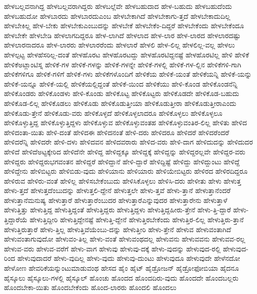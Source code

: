{ಹೇಳಬಲ್ಲವನಾಗಿದ್ದ
ಹೇಳಬಲ್ಲವರಾಗಿದ್ದರು
ಹೇಳಬಲ್ಲೆವೇ
ಹೇಳಬಹುದಾದ
ಹೇಳ-ಬಹುದು
ಹೇಳಬಹುದೆಂದು
ಹೇಳಬಹುದೋ
ಹೇಳಬಾರದು
ಹೇಳಬಾರದುಎಂಬ
ಹೇಳಬೇಕಾಗಿದೆ
ಹೇಳಬೇಕಾಗು-ತ್ತದೆ
ಹೇಳಬೇಕಾದುದಿಲ್ಲ
ಹೇಳಬೇಕಿಲ್ಲ
ಹೇಳ-ಬೇಕು
ಹೇಳಬೇಕುಎಂಬುದನ್ನು
ಹೇಳಬೇಕೆ
ಹೇಳಬೇಕೆಂ-ದಿದ್ದರೆ
ಹೇಳಬೇಕೆಂದು
ಹೇಳಬೇಕೆಂದೂ
ಹೇಳಬೇಕೇ
ಹೇಳಬೇಡಿ
ಹೇಳಲಾಗದಿದ್ದರೂ
ಹೇಳ-ಲಾಗಿದೆ
ಹೇಳಲಾದ
ಹೇಳ-ಲಾರ
ಹೇಳ-ಲಾರದ
ಹೇಳಲಾರದಷ್ಟು
ಹೇಳಲಾರನಾದರೂ
ಹೇಳ-ಲಾರರು
ಹೇಳಲಾರರೆಂದು
ಹೇಳಲಾರೆ
ಹೇಳಲಿ
ಹೇಳ-ಲಿಲ್ಲ
ಹೇಳಲಿಲ್ಲ-ವಲ್ಲ
ಹೇಳಲು
ಹೇಳಲ್ಪಟ್ಟ
ಹೇಳಹೆಸರಿಲ್ಲ-ದಂತೆ
ಹೇಳಹೊರಟ
ಹೇಳಹೊರಟದ್ದು
ಹೇಳಹೊರಟಿದ್ದನಷ್ಟೆ
ಹೇಳಹೊರಟಿಲ್ಲ
ಹೇಳಿ
ಹೇಳಿಕೆ
ಹೇಳಿಕೆಅಟ್ಲಾಂಟಿಸ್ನ
ಹೇಳಿಕೆ-ಗಳ
ಹೇಳಿಕೆ-ಗಳನ್ನು
ಹೇಳಿಕೆ-ಗಳನ್ನೇ
ಹೇಳಿಕೆ-ಗಳಲ್ಲಿ
ಹೇಳಿಕೆ-ಗಳ-ಲ್ಲಿನ
ಹೇಳಿಕೆಗಳಿ-ಗಾಗಿ
ಹೇಳಿಕೆಗಳಿಗೂ
ಹೇಳಿಕೆ-ಗಳಿಗೆ
ಹೇಳಿಕೆ-ಗಳು
ಹೇಳಿಕೆಗಳೊಂದಿಗೆ
ಹೇಳಿಕೆಯ
ಹೇಳಿಕೆ-ಯಂತೆ
ಹೇಳಿಕೆಯನ್ನಿ
ಹೇಳಿಕೆ-ಯನ್ನು
ಹೇಳಿಕೆ-ಯನ್ನೂ
ಹೇಳಿಕೆ-ಯಲ್ಲಿ
ಹೇಳಿಕೆಯಲ್ಲಿದ್ದಂತೆ
ಹೇಳಿಕೆ-ಯಿಂದ
ಹೇಳಿಕೆಯು
ಹೇಳಿ-ಕೊಂಡ
ಹೇಳಿಕೊಂಡನೆನ್ನಿ
ಹೇಳಿಕೊಂಡರು
ಹೇಳಿಕೊಂಡಳು
ಹೇಳಿ-ಕೊಂಡು
ಹೇಳಿಕೊಟ್ಟ
ಹೇಳಿಕೊಟ್ಟರು
ಹೇಳಿಕೊಡದೇ
ಹೇಳಿಕೊಡ-ಬಹುದು
ಹೇಳಿಕೊಡ-ಲಿಲ್ಲ
ಹೇಳಿಕೊಡಲು
ಹೇಳಿಕೊಡು
ಹೇಳಿಕೊಡುತ್ತೀಯಾ
ಹೇಳಿಕೊಡುತ್ತೀರಾ
ಹೇಳಿಕೊಡುತ್ತೀರಾಎಂದು
ಹೇಳಿಕೊಡು-ತ್ತೇನೆ
ಹೇಳಿಕೊಡು-ವರು
ಹೇಳಿಕೊಳ್ಳದೆ
ಹೇಳಿಕೊಳ್ಳಲಾದರೂ
ಹೇಳಿಕೊಳ್ಳಲು
ಹೇಳಿಕೊಳ್ಳಲೂ
ಹೇಳಿಕೊಳ್ಳುತ್ತಿದ್ದ
ಹೇಳಿಕೊಳ್ಳುತ್ತಿದ್ದಳು
ಹೇಳಿಕೊಳ್ಳುವ
ಹೇಳಿಕೊಳ್ಳುವಂತಹ
ಹೇಳಿಕೊಳ್ಳುವಂತಿರ-ಲಿಲ್ಲ
ಹೇಳಿತು
ಹೇಳಿದ
ಹೇಳಿದಂತಾ-ಯಿತು
ಹೇಳಿ-ದಂತೆ
ಹೇಳಿದಈ
ಹೇಳಿದನಂತೆ
ಹೇಳಿ-ದರು
ಹೇಳಿದರೂ
ಹೇಳಿದರೆ
ಹೇಳಿದರೆಂದರೆ
ಹೇಳಿದರೆನ್ನಿ
ಹೇಳಿದರೇ
ಹೇಳಿ-ದಳು
ಹೇಳಿದವನ
ಹೇಳಿದವರಾರು
ಹೇಳಿದ-ವರು
ಹೇಳಿ-ದಾಗ
ಹೇಳಿದುದನ್ನು
ಹೇಳಿದುದರ
ಹೇಳಿದೆ
ಹೇಳಿದೆಅಟ್ಟಕ್ಕೇರಿದ
ಹೇಳಿದೆನೇ
ಹೇಳಿದ್ದ
ಹೇಳಿದ್ದಕ್ಕೂ
ಹೇಳಿದ್ದಕ್ಕೆ
ಹೇಳಿದ್ದನ್ನು
ಹೇಳಿದ್ದರಲ್ಲವೇ
ಹೇಳಿದ್ದರ-ವರು
ಹೇಳಿದ್ದರು
ಹೇಳಿದ್ದರುಭಗವಂತನ
ಹೇಳಿದ್ದರೆ
ಹೇಳಿದ್ದಾನೆ
ಹೇಳಿ-ದ್ದಾರೆ
ಹೇಳಿದ್ದಿಷ್ಟೆ
ಹೇಳಿದ್ದು
ಹೇಳಿದ್ದುಂಟು
ಹೇಳಿದ್ದೆ
ಹೇಳಿದ್ದೇನು
ಹೇಳಿಬಿಟ್ಟರು
ಹೇಳಿಬಿಡು-ವುದು
ಹೇಳಿಯಾನು
ಹೇಳಿಯಾರು
ಹೇಳಿಯೇಬಿಟ್ಟರು
ಹೇಳಿರದ
ಹೇಳಿರದಿದ್ದರೂ
ಹೇಳಿರುವ
ಹೇಳಿರು-ವಂತೆ
ಹೇಳಿಲ್ಲ
ಹೇಳಿಸಬೇಕೆಂಬುದು
ಹೇಳಿಸಿಕೊಳ್ಳಲು
ಹೇಳಿಸಿ-ದರು
ಹೇಳೀತು
ಹೇಳು
ಹೇಳುತ್ತ
ಹೇಳು-ತ್ತದೆ
ಹೇಳುತ್ತದೆಂಬುದನ್ನು
ಹೇಳುತ್ತಲಿ-ದ್ದೇನೆ
ಹೇಳುತ್ತಲೇ
ಹೇಳು-ತ್ತವೆ
ಹೇಳು-ತ್ತಾನೆ
ಹೇಳುತ್ತಾನೆಂದರೆ
ಹೇಳುತ್ತಾನೆಮನುಷ್ಯ
ಹೇಳುತ್ತಾರೆ
ಹೇಳುತ್ತಾರೆಂಬುದರ
ಹೇಳುತ್ತಾರೆಎನ್ನುವುದರ
ಹೇಳುತ್ತಾರೇನು
ಹೇಳುತ್ತಾಳೆ
ಹೇಳುತ್ತಿತ್ತು
ಹೇಳುತ್ತಿದ್ದ
ಹೇಳುತ್ತಿದ್ದಂತೆ
ಹೇಳುತ್ತಿದ್ದರು
ಹೇಳುತ್ತಿದ್ದಳು
ಹೇಳುತ್ತಿದ್ದಹೀರು-ತ್ತೇನೆ
ಹೇಳು-ತ್ತಿ-ದ್ದಾರೆ
ಹೇಳು-ತ್ತಿದ್ದಾರೆಯೆ
ಹೇಳುತ್ತಿದ್ದೀರಿ
ಹೇಳುತ್ತಿದ್ದೇನಷ್ಟೆ
ಹೇಳುತ್ತಿ-ದ್ದೇನೆ
ಹೇಳುತ್ತಿರಬೇಕೆಂದು
ಹೇಳುತ್ತಿರ-ಲಿಲ್ಲ
ಹೇಳುತ್ತಿರು-ತ್ತಾನೆ
ಹೇಳುತ್ತಿರುತ್ತಾರೆ
ಹೇಳು-ತ್ತಿಲ್ಲ
ಹೇಳುತ್ತಿವೆಯೆಂಬು-ದನ್ನು
ಹೇಳುತ್ತೀರಿ
ಹೇಳು-ತ್ತೇನೆ
ಹೇಳುವ
ಹೇಳುವಂತಾಗಿದೆ
ಹೇಳುವಂತಾಗುವುದೋ
ಹೇಳುವಂ-ತಿಲ್ಲ
ಹೇಳು-ವಂತೆ
ಹೇಳುವಂಥದಲ್ಲ
ಹೇಳುವನು
ಹೇಳುವವನು
ಹೇಳುವವ-ರಲ್ಲ
ಹೇಳುವ-ವರು
ಹೇಳುವ-ವರೆಗೆ
ಹೇಳು-ವಾಗ
ಹೇಳುವು
ಹೇಳುವು-ದಕ್ಕೆ
ಹೇಳು-ವುದನ್ನು
ಹೇಳುವುದ-ರಲ್ಲಿ
ಹೇಳುವುದ-ರಿಂದ
ಹೇಳುವುದಾದರೆ
ಹೇಳು-ವುದಿಲ್ಲ
ಹೇಳು-ವುದು
ಹೇಳುವು-ದುಂಟು
ಹೇಳುವುದೂ
ಹೇಳುವುದೇ
ಹೇಳೆನದೋ
ಹೇಳೋಣ
ಹೇವರಿಕೆಯನ್ನುಂಟುಮಾಡುವಂಥ
ಹೇಸದ
ಹೈಂ
ಹೈಟ್
ಹೈಡ್ರೋಜನ್
ಹೈಡ್ರೋಫೋಬಿಯಾ
ಹೈದನೂ
ಹೈಸ್ಕೂಲು
ಹೈಸ್ಕೂಲು-ಗಳಲ್ಲಿ
ಹೈಸ್ಕೂಲ್
ಹೊಂಚು
ಹೊಂದದ
ಹೊಂದದಿರು-ವುದು
ಹೊಂದದೇ
ಹೊಂದಬಲ್ಲರು
ಹೊಂದಬೇಕಾ-ಯಿತು
ಹೊಂದಬೇಕೆಂದು
ಹೊಂದ-ಲಾರರು
ಹೊಂದಲಿ
ಹೊಂದಲು
}
